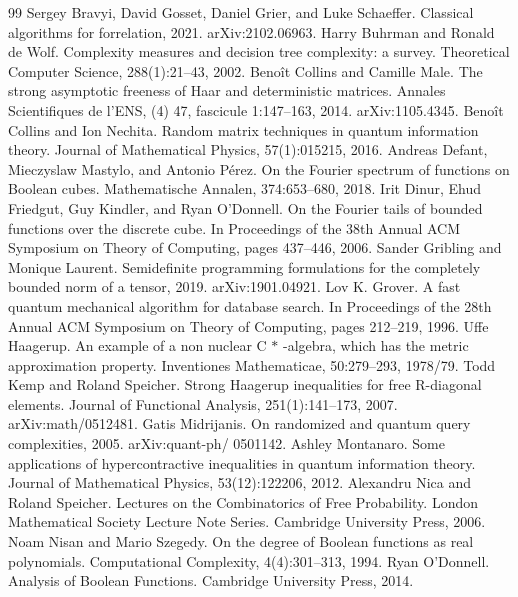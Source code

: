\begin{thebibliography}{99}
 Sergey Bravyi, David Gosset, Daniel Grier, and Luke Schaeffer. Classical algorithms for forrelation, 2021. arXiv:2102.06963.
 Harry Buhrman and Ronald de Wolf. Complexity measures and decision tree complexity: a survey. Theoretical Computer Science, 288(1):21–43, 2002.
 Benoît Collins and Camille Male. The strong asymptotic freeness of Haar and deterministic matrices. Annales Scientifiques de l’ENS, (4) 47, fascicule 1:147–163, 2014. arXiv:1105.4345.
 Benoît Collins and Ion Nechita. Random matrix techniques in quantum information theory. Journal of Mathematical Physics, 57(1):015215, 2016.
 Andreas Defant, Mieczyslaw Mastylo, and Antonio Pérez. On the Fourier spectrum of functions on Boolean cubes. Mathematische Annalen, 374:653–680, 2018.
 Irit Dinur, Ehud Friedgut, Guy Kindler, and Ryan O’Donnell. On the Fourier tails of bounded functions over the discrete cube. In Proceedings of the 38th Annual ACM Symposium on Theory of Computing, pages 437–446, 2006.
 Sander Gribling and Monique Laurent. Semidefinite programming formulations for the completely bounded norm of a tensor, 2019. arXiv:1901.04921.
 Lov K. Grover. A fast quantum mechanical algorithm for database search. In Proceedings of the 28th Annual ACM Symposium on Theory of Computing, pages 212–219, 1996.
 Uffe Haagerup. An example of a non nuclear C $\ast$ -algebra, which has the metric approximation property. Inventiones Mathematicae, 50:279–293, 1978/79.
 Todd Kemp and Roland Speicher. Strong Haagerup inequalities for free R-diagonal elements. Journal of Functional Analysis, 251(1):141–173, 2007. arXiv:math/0512481.
 Gatis Midrijanis. On randomized and quantum query complexities, 2005. arXiv:quant-ph/ 0501142.
 Ashley Montanaro. Some applications of hypercontractive inequalities in quantum information theory. Journal of Mathematical Physics, 53(12):122206, 2012.
 Alexandru Nica and Roland Speicher. Lectures on the Combinatorics of Free Probability. London Mathematical Society Lecture Note Series. Cambridge University Press, 2006.
 Noam Nisan and Mario Szegedy. On the degree of Boolean functions as real polynomials. Computational Complexity, 4(4):301–313, 1994.
 Ryan O’Donnell. Analysis of Boolean Functions. Cambridge University Press, 2014.

\end{thebibliography}
